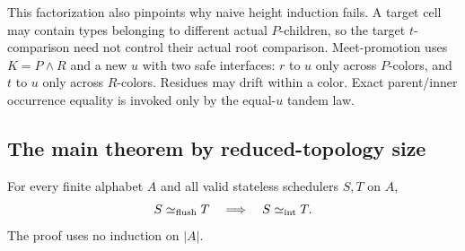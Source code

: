 This factorization also pinpoints why naive height induction fails.  A target
cell may contain types belonging to different actual \(P\)-children, so the
target \(t\)-comparison need not control their actual root comparison.
Meet-promotion uses \(K=P\wedge R\) and a new \(u\) with two safe interfaces:
\(r\) to \(u\) only across \(P\)-colors, and \(t\) to \(u\) only across
\(R\)-colors.  Residues may drift within a color.  Exact parent/inner
occurrence equality is invoked only by the equal-\(u\) tandem law.

\subsection{The main theorem by reduced-topology size}

\begin{theorem}
\label{thm:topology-recursive-flush-sufficiency}
For every finite alphabet \(A\) and all valid stateless schedulers \(S,T\) on
\(A\),
\[
 S\mathrel{\simeq_{\mathrm{flush}}} T\quad\Longrightarrow\quad S\mathrel{\simeq_{\mathrm{int}}} T.
\]
The proof uses no induction on \(|A|\).
\end{theorem}

